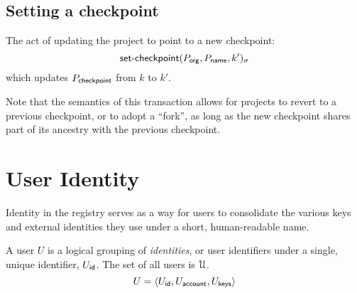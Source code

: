 \subsection{Setting a checkpoint}
The act of updating the project to point to a new checkpoint:
\[
    \operatorname{\mathsf{set-checkpoint}}\lparen P_{\mathsf{org}}, P_{\mathsf{name}}, k'\rparen_\sigma
\]
which updates $P_{\mathsf{checkpoint}}$ from $k$ to $k'$.

Note that the semantics of this transaction allows for projects to revert to
a previous checkpoint, or to adopt a ``fork'', as long as the new checkpoint
shares part of its ancestry with the previous checkpoint.

\section{User Identity}

Identity in the registry serves as a way for users to consolidate the various
keys and external identities they use under a short, human-readable name.

A user $U$ is a logical grouping of {\em identities}, or user identifiers under a
single, unique identifier, $U_{\mathsf{id}}$. The set of all users is $\mathcal{U}$.
\[
    U = \langle U_{\mathsf{id}}, U_{\mathsf{account}}, U_{\mathsf{keys}}\rangle
\]

